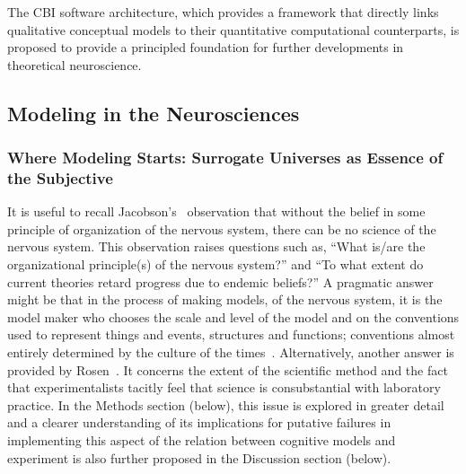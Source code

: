 \documentclass[10pt,letterpaper]{article}
\begin{document}
The CBI software architecture, which provides a framework that directly links qualitative conceptual models to their quantitative computational counterparts, is proposed to provide a principled foundation for further developments in theoretical neuroscience.



\subsection*{Modeling in the Neurosciences}
\label{subsection:compneuro}

\subsubsection*{Where Modeling Starts: Surrogate Universes as Essence of the Subjective}

It is useful to recall Jacobson's~\cite{jacobson93} observation that without the belief in some principle of organization of the nervous system, there can be no science of the nervous system. This observation raises questions such as, ``What is/are the organizational principle(s) of the nervous system?'' and ``To what extent do current theories retard progress due to endemic beliefs?'' A pragmatic answer might be that in the process of making models, of the nervous system, it is the model maker who chooses the scale and level of the model and on the conventions used to represent things and events, structures and functions; conventions almost entirely determined by the culture of the times~\cite{jacobson93}. Alternatively, another answer is provided by Rosen~\cite{rosen96}. It concerns the extent of the scientific method and the fact that experimentalists tacitly feel that science is consubstantial with laboratory practice. In the Methods section (below), this issue is explored in greater detail and a clearer understanding of its implications for putative failures in implementing this aspect of the relation between cognitive models and experiment is also further proposed in the Discussion section (below).
\end{document}
